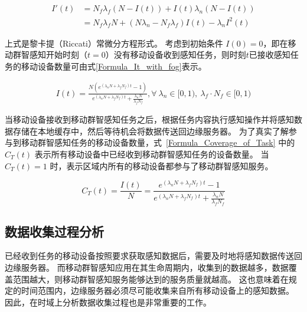 \begin{equation}
  \label{Formula_SIR_with_fog}
  \begin{aligned}
    I'(t) &= N_f \lambda_f (N-I(t)) + I(t) \lambda_n (N-I(t)) \\
    &= N_f \lambda_f N + ( N \lambda_n - N_f \lambda_f) I(t) - \lambda_n I^2(t) 
  \end{aligned}
\end{equation}

上式是黎卡提（Riccati）常微分方程形式。
考虑到初始条件 $I(0)=0$，即在移动群智感知开始时刻（$t=0$）没有移动设备收到感知任务，则时刻$t$已接收感知任务的移动设备数量可由式\eqref{Formula_It_with_fog}表示。

\begin{equation}
\label{Formula_It_with_fog}
\begin{aligned}
I(t) = \frac{N (e^{(\lambda_n N + \lambda_f N_f) t} - 1)}{e^{(\lambda_n N + \lambda_f N_f) t} + \frac{\lambda_n N}{\lambda_f N_f}}, \forall\ \lambda_n \in [0, 1),\ \lambda_f \cdot N_f \in [0, 1)
\end{aligned}
\end{equation}


当移动设备接收到移动群智感知任务之后，根据任务内容执行感知操作并将感知数据存储在本地缓存中，然后等待机会将数据传送回边缘服务器。
为了真实了解参与到移动群智感知任务的移动设备数量，式~\eqref{Formula_Coverage_of_Task} 中的 $C_T(t)$ 表示所有移动设备中已经收到移动群智感知任务的设备数量。
当 $C_T(t)=1$ 时，表示区域内所有的移动设备都参与了移动群智感知服务。

\begin{equation}
  \label{Formula_Coverage_of_Task}
  C_T(t) = \frac{I(t)}{N} = \frac{e^{(\lambda_n N + \lambda_f N_f) t} - 1}{e^{(\lambda_n N + \lambda_f N_f) t} + \frac{\lambda_n N}{\lambda_f N_f}}
\end{equation}

\subsection{数据收集过程分析}

已经收到任务的移动设备按照要求获取感知数据后，需要及时地将感知数据传送回边缘服务器。
而移动群智感知应用在其生命周期内，收集到的数据越多，数据覆盖范围越大，则移动群智感知服务能够达到的服务质量就越高。
这也意味着在规定的时间范围内，边缘服务器必须尽可能收集来自所有移动设备上的感知数据。
因此，在时域上分析数据收集过程也是非常重要的工作。

